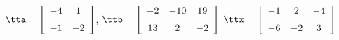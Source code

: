 {$\tta = \left[ \begin {array}{cc} -4&1 \\ \noalign{\medskip} -1&-2 \end {array} \right] $, 
 \quad
$\ttb=\left[ \begin {array}{ccc} -2&-10&19\\ \noalign{\medskip} 13&2&-2 \end {array} \right] $}
{$\ttx=\left[ \begin {array}{ccc} -1&2&-4\\ \noalign{\medskip} -6&-2&3  \end {array} \right] $}
